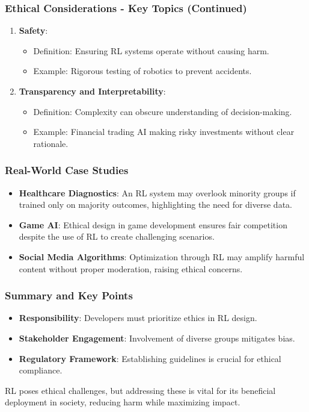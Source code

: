 \documentclass{beamer}
\begin{document}
\begin{frame}[fragile]
    \frametitle{Ethical Considerations - Key Topics (Continued)}
    \begin{enumerate}[resume]
        \item \textbf{Safety}:
        \begin{itemize}
            \item Definition: Ensuring RL systems operate without causing harm.
            \item Example: Rigorous testing of robotics to prevent accidents.
        \end{itemize}
        
        \item \textbf{Transparency and Interpretability}:
        \begin{itemize}
            \item Definition: Complexity can obscure understanding of decision-making.
            \item Example: Financial trading AI making risky investments without clear rationale.
        \end{itemize}
    \end{enumerate}
\end{frame}

\begin{frame}[fragile]
    \frametitle{Real-World Case Studies}
    \begin{itemize}
        \item \textbf{Healthcare Diagnostics}:
        An RL system may overlook minority groups if trained only on majority outcomes, highlighting the need for diverse data.
        
        \item \textbf{Game AI}:
        Ethical design in game development ensures fair competition despite the use of RL to create challenging scenarios.
        
        \item \textbf{Social Media Algorithms}:
        Optimization through RL may amplify harmful content without proper moderation, raising ethical concerns.
    \end{itemize}
\end{frame}

\begin{frame}[fragile]
    \frametitle{Summary and Key Points}
    \begin{itemize}
        \item \textbf{Responsibility}: Developers must prioritize ethics in RL design.
        \item \textbf{Stakeholder Engagement}: Involvement of diverse groups mitigates bias.
        \item \textbf{Regulatory Framework}: Establishing guidelines is crucial for ethical compliance.
    \end{itemize}
    RL poses ethical challenges, but addressing these is vital for its beneficial deployment in society, reducing harm while maximizing impact.
\end{frame}
\end{document}
